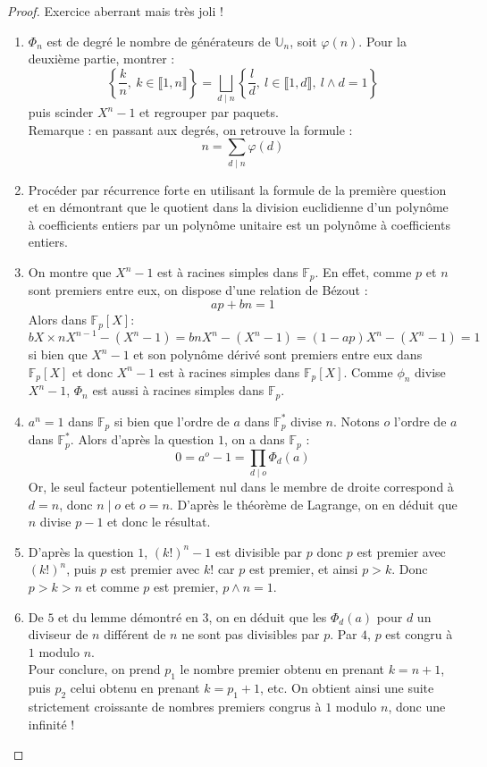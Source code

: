 \documentclass[french,a4paper]{article}
\newcommand{\U}{\mathbb{U}}
\newcommand{\st}{^*}
\newcommand{\F}{\mathbb{F}}
\theoremstyle{plain}
\theoremstyle{definition}
\theoremstyle{remark}
\begin{document}
\begin{proof}
	Exercice aberrant mais très joli !
	\begin{enumerate}
		\item $\Phi_n$ est de degré le nombre de générateurs de $\U_n$, soit $\varphi(n)$. Pour la deuxième partie, montrer : $$\left\{\frac{k}{n}, \ k\in\llbracket 1,n\rrbracket\right\}=\bigsqcup_{d\mid n}\left\{\frac{l}{d},\ l\in\llbracket1,d\rrbracket,\ l\wedge d=1\right\}$$ puis scinder $X^n-1$ et regrouper par paquets. \\ Remarque : en passant aux degrés, on retrouve la formule : $$n=\sum_{d\mid n}\varphi(d)$$
		\item Procéder par récurrence forte en utilisant la formule de la première question et en démontrant que le quotient dans la division euclidienne d'un polynôme à coefficients entiers par un polynôme unitaire est un polynôme à coefficients entiers.
		\item On montre que $X^n-1$ est à racines simples dans $\F_p$. En effet, comme $p$ et $n$ sont premiers entre eux, on dispose d'une relation de Bézout : $$ap+bn=1$$ Alors dans $\F_p[X]$: $$bX\times nX^{n-1}-(X^n-1)=bnX^n-(X^n-1)=(1-ap)X^n-(X^n-1)=1$$ si bien que $X^n-1$ et son polynôme dérivé sont premiers entre eux dans $\F_p[X]$ et donc $X^n-1$ est à racines simples dans $\F_p[X]$. Comme $\phi_n$ divise $X^n-1$, $\Phi_n$ est aussi à racines simples dans $\F_p$.
		\item $a^n=1$ dans $\F_p$ si bien que l'ordre de $a$ dans $\F_p\st$ divise $n$. Notons $o$ l'ordre de $a$ dans $\F_p\st$. Alors d'après la question $1$, on a dans $\F_p$ : $$0=a^o-1=\prod_{d\mid o}\Phi_d(a)$$ Or, le seul facteur potentiellement nul dans le membre de droite correspond à $d=n$, donc $n\mid o$ et $o=n$. D'après le théorème de Lagrange, on en déduit que $n$ divise $p-1$ et donc le résultat.
		\item D'après la question $1$, $(k!)^n-1$ est divisible par $p$ donc $p$ est premier avec $(k!)^n$, puis $p$ est premier avec $k!$ car $p$ est premier, et ainsi $p>k$. Donc $p>k>n$ et comme $p$ est premier, $p\wedge n=1$.
		\item De $5$ et du lemme démontré en $3$, on en déduit que les $\Phi_d(a)$ pour $d$ un diviseur de $n$ différent de $n$ ne sont pas divisibles par $p$. Par $4$, $p$ est congru à $1$ modulo $n$. \\ Pour conclure, on prend $p_1$ le nombre premier obtenu en prenant $k=n+1$, puis $p_2$ celui obtenu en prenant $k=p_1+1$, etc. On obtient ainsi une suite strictement croissante de nombres premiers congrus à $1$ modulo $n$, donc une infinité !
	\end{enumerate}
\end{proof}
\end{document}

